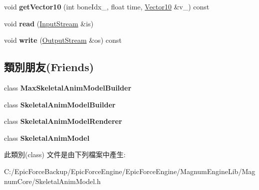 \begin{DoxyCompactItemize}
\item 
void {\bfseries get\+Vector10} (int bone\+Idx\+\_\+, float time, \hyperlink{class_magnum_1_1_vector10}{Vector10} \&v\+\_\+) const \hypertarget{class_magnum_1_1endif_1_1_animation_a37b050db8b8c6eb92db2f0b6d71680ee}{}\label{class_magnum_1_1endif_1_1_animation_a37b050db8b8c6eb92db2f0b6d71680ee}

\item 
void {\bfseries read} (\hyperlink{class_magnum_1_1_input_stream}{Input\+Stream} \&is)\hypertarget{class_magnum_1_1endif_1_1_animation_acc029237ce4dd7f09c4a8ebda32ff5a8}{}\label{class_magnum_1_1endif_1_1_animation_acc029237ce4dd7f09c4a8ebda32ff5a8}

\item 
void {\bfseries write} (\hyperlink{class_magnum_1_1_output_stream}{Output\+Stream} \&os) const \hypertarget{class_magnum_1_1endif_1_1_animation_adb7ce2af3546d4f264ae8d2f85d8ff49}{}\label{class_magnum_1_1endif_1_1_animation_adb7ce2af3546d4f264ae8d2f85d8ff49}

\end{DoxyCompactItemize}
\subsection*{類別朋友(Friends)}
\begin{DoxyCompactItemize}
\item 
class {\bfseries Max\+Skeletal\+Anim\+Model\+Builder}\hypertarget{class_magnum_1_1endif_1_1_animation_a68b08defd5651552ef2b6f922eee7ff9}{}\label{class_magnum_1_1endif_1_1_animation_a68b08defd5651552ef2b6f922eee7ff9}

\item 
class {\bfseries Skeletal\+Anim\+Model\+Builder}\hypertarget{class_magnum_1_1endif_1_1_animation_a31d58261bc4fbf7a6c1d2d2547437974}{}\label{class_magnum_1_1endif_1_1_animation_a31d58261bc4fbf7a6c1d2d2547437974}

\item 
class {\bfseries Skeletal\+Anim\+Model\+Renderer}\hypertarget{class_magnum_1_1endif_1_1_animation_ae50fe2cd824b9de98af4dd4aa51d4935}{}\label{class_magnum_1_1endif_1_1_animation_ae50fe2cd824b9de98af4dd4aa51d4935}

\item 
class {\bfseries Skeletal\+Anim\+Model}\hypertarget{class_magnum_1_1endif_1_1_animation_a88c72f2f6b125ba518843b71080035e5}{}\label{class_magnum_1_1endif_1_1_animation_a88c72f2f6b125ba518843b71080035e5}

\end{DoxyCompactItemize}


此類別(class) 文件是由下列檔案中產生\+:\begin{DoxyCompactItemize}
\item 
C\+:/\+Epic\+Force\+Backup/\+Epic\+Force\+Engine/\+Epic\+Force\+Engine/\+Magnum\+Engine\+Lib/\+Magnum\+Core/Skeletal\+Anim\+Model.\+h\end{DoxyCompactItemize}
